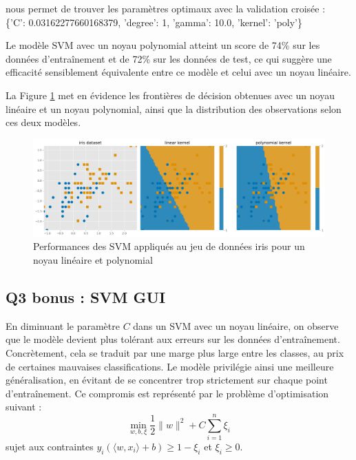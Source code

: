 \documentclass{scrartcl}
\begin{document}
nous permet de trouver les paramètres optimaux avec la validation croisée :\\
\{'C': 0.03162277660168379, 'degree': 1, 'gamma': 10.0, 'kernel': 'poly'\}\newline

Le modèle SVM avec un noyau polynomial atteint un score de 74\% sur les données d'entraînement et de 72\% sur les données de test, ce qui suggère une efficacité sensiblement équivalente entre ce modèle et celui avec un noyau linéaire.\newline

La Figure \ref{fig:noyaux} met en évidence les frontières de décision obtenues avec un noyau linéaire et un noyau polynomial, ainsi que la distribution des observations selon ces deux modèles.\newline

\begin{figure}[H]
    \centering
    \includegraphics[width=1\textwidth]{../images/iris.png}
    \caption{\centering Performances des SVM appliqués au jeu de données iris pour un noyau linéaire et polynomial} 
    \label{fig:noyaux}
\end{figure}


\subsection{Q3 bonus : SVM GUI}

\hspace{7pt} En diminuant le paramètre $C$ dans un SVM avec un noyau linéaire, on observe que le modèle devient plus tolérant aux erreurs sur les données d'entraînement. Concrètement, cela se traduit par une marge plus large entre les classes, au prix de certaines mauvaises classifications. Le modèle privilégie ainsi une meilleure généralisation, en évitant de se concentrer trop strictement sur chaque point d'entraînement.  Ce compromis est représenté par le problème d'optimisation suivant :
\[
\min_{w, b, \xi} \frac{1}{2} \|w\|^2 + C \sum_{i=1}^{n} \xi_i
\]
sujet aux contraintes \(y_i (\langle w, x_i \rangle + b) \geq 1 - \xi_i\) et \(\xi_i \geq 0\).
\newline
\end{document}
